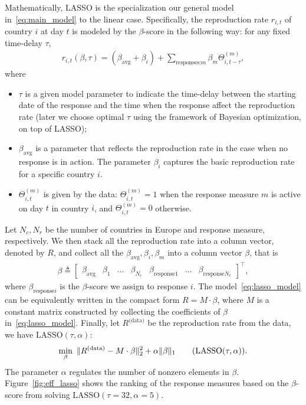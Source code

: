 \documentclass[11pt]{article}
\begin{document}
Mathematically, LASSO is the specialization our general model in~\eqref{eq:main_model} to the linear case. Specifically, the reproduction rate $r_{i, t}$ of country $i$ at day $t$ is modeled by the $\beta$-score in the following way: for any fixed time-delay $\tau$, 
\begin{align}
    r_{i, t} (\beta, \tau) = (\beta_{\text{avg}} + \beta_{i}) + \sum_{\text{responses:} m}\beta_{m} \Theta^{(m)}_{i, t- \tau},
    \label{eq:lasso_model}
\end{align}
where     
\begin{itemize}
    \item $\tau$ is a given model parameter to indicate the time-delay between the starting date of the response and the time when the response affect the reproduction rate (later we choose optimal $\tau$ using the framework of Bayesian optimization, on top of LASSO);

    \item $\beta_{\text{avg}}$ is a parameter that reflects the reproduction rate in the case when no response is in action. The parameter $\beta_{i}$ captures the basic reproduction rate for a specific country $i$. 
        
    \item $\Theta_{i,t}^{(m)}$ is given by the data: $\Theta_{i,t}^{(m)} = 1$ when the response measure $m$ is active on day $t$ in country $i$, and $\Theta_{i,t}^{(m)} = 0$ otherwise.
\end{itemize}
Let $N_c, N_r$ be the number of countries in Europe and response measure, respectively. We then stack all the reproduction rate into a column vector, denoted by $R$, and collect all the $\beta_{\text{avg}}, \beta_i, \beta_{m}$ into a column vector $\beta$, that is 
\begin{align}
    \beta\triangleq \begin{bmatrix}
        \beta_{\text{avg}} &
        \beta_1 &
        \ldots &
        \beta_{N_c} &
        \beta_{\text{response} 1} &
        \ldots &
        \beta_{\text{response} N_r}
        \end{bmatrix}^\top,
\end{align}
where $\beta_{\text{response} i}$ is the $\beta$-score we assign to response $i$. The model~\eqref{eq:lasso_model} can be equivalently written in the compact form $R = M\cdot \beta$, where $M$ is a constant matrix constructed by collecting the coefficients of $\beta$ in~\eqref{eq:lasso_model}. Finally, let $R^{\text{(data)}}$ be the reproduction rate from the data, we have  $\text{LASSO}(\tau, \alpha)$: 
\begin{align}
        \min_{\beta}~ \|R^{\text{(data)}} - M\cdot \beta\|_2^2 + \alpha \|\beta\|_1
        \label{eq:lasso_form}\tag{$\text{LASSO}(\tau, \alpha)$}.
\end{align}
The parameter $\alpha$ regulates the number of nonzero elements in $\beta$. Figure~\ref{fig:eff_lasso} shows the ranking of the response measures based on the $\beta$-score from solving $\text{LASSO}(\tau = 32, \alpha = 5)$.
\end{document}
